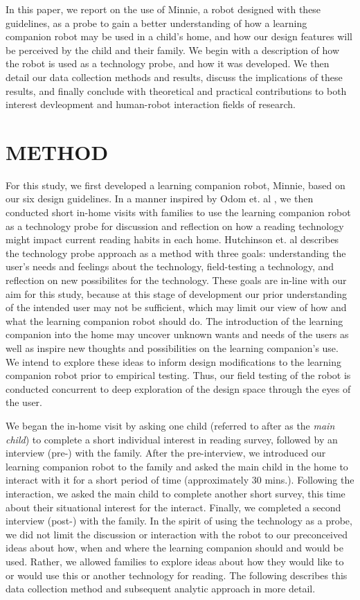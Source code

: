 \documentclass{sigchi}
\begin{document}
In this paper, we report on the use of Minnie, a robot designed with these guidelines, as a probe to gain a better understanding of how a learning companion robot may be used in a child's home, and how our design features will be perceived by the child and their family.  We begin with a description of how the robot is used as a technology probe, and how it was developed.  We then detail our data collection methods and results, discuss the implications of these results, and finally conclude with theoretical and practical contributions to both interest devleopment and human-robot interaction fields of research.


\section{METHOD}
 For this study, we first developed a learning companion robot, Minnie, based on our six design guidelines. In a manner inspired by Odom et. al \cite{Odom:2012}, we then conducted short in-home visits with families to use the learning companion robot as a technology probe \cite{Hutchinson:2003} for discussion and reflection on how a reading technology might impact current reading habits in each home.  Hutchinson et. al \cite{Hutchinson:2003} describes the technology probe approach as a method with three goals: understanding the user's needs and feelings about the technology, field-testing a technology, and reflection on new possibilites for the technology.  These goals are in-line with our aim for this study, because at this stage of development our prior understanding of the intended user may not be sufficient, which may limit our view of how and what the learning companion robot should do. The introduction of the learning companion into the home may uncover unknown wants and needs of the users as well as inspire new thoughts and possibilities on the learning companion's use.  We intend to explore these ideas to inform design modifications to the learning companion robot  prior to empirical testing. Thus, our field testing of the robot is conducted concurrent to deep exploration of the design space through the eyes of the user.  
 
 We began the in-home visit by asking one child (referred to after as the \textit{main child}) to complete a short individual interest in reading survey, followed by an interview (pre-) with the family.  After the pre-interview, we introduced our learning companion robot to the family and asked the main child in the home to interact with it for a short period of time (approximately 30 mins.). Following the interaction, we asked the main child to complete another short survey, this time about their situational interest for the interact.  Finally, we completed a second interview (post-) with the family. In the spirit of using the technology as a probe, we did not limit the discussion or interaction with the robot to our preconceived ideas about how, when and where the learning companion should and would be used. Rather, we allowed families to explore ideas about how they would like to or would use this or another technology for reading. The following describes this data collection method and subsequent analytic approach in more detail.
 
\end{document}
